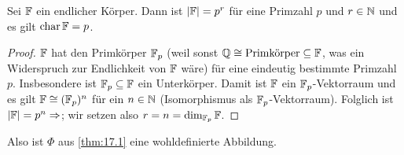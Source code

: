 \documentclass[12pt,a4paper]{scrartcl}
\begin{document}
\begin{lem}
	Sei $\mathbb F$ ein endlicher Körper. Dann ist $|\mathbb F| = p^r$ für eine Primzahl $p$ und $r\in\mathbb N$ und es gilt $\operatorname{char} \mathbb F = p$.
\end{lem}

\begin{proof}
	$\mathbb F$ hat den Primkörper $\mathbb F_p$ (weil sonst $\mathbb Q \cong \text{Primkörper} \subseteq \mathbb F$, was ein Widerspruch zur Endlichkeit von $\mathbb F$ wäre) für eine eindeutig bestimmte Primzahl $p$. Insbesondere ist $\mathbb F_p\subseteq \mathbb F$ ein Unterkörper. Damit ist $\mathbb F$ ein $\mathbb F_p$-Vektorraum und es gilt $\mathbb F\cong (\mathbb F_p)^n$ für ein $n\in\mathbb N$ (Isomorphismus als $\mathbb F_p$-Vektorraum). Folglich ist $|\mathbb F| = p^n\Rightarrow$; wir setzen also $r = n = \dim_{\mathbb F_p}\mathbb F$.
\end{proof}
Also ist $\Phi$ aus \cref{thm:17.1} eine wohldefinierte Abbildung.
\end{document}
